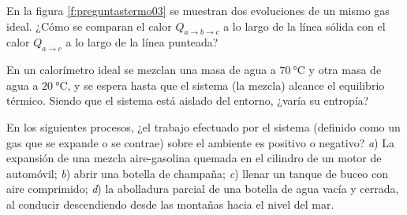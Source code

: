 %
\begin{Exercise}\label{p:preguntastermo03}
  En la figura \ref{f:preguntastermo03} se muestran dos evoluciones de un mismo gas ideal. ¿Cómo se comparan el calor $Q_{a\rightarrow b \rightarrow c}$ a lo largo de la línea sólida con el calor $Q_{a\rightarrow c}$ a lo largo de la línea punteada?
\end{Exercise}
%
\begin{center}
\end{center}
%
\begin{Exercise}
  {}{}
  En un calorímetro ideal se mezclan una masa de agua a $\SI{70}{\celsius}$ y otra masa de agua a $\SI{20}{\celsius}$, y se espera hasta que el sistema (la mezcla) alcance el equilibrio térmico. Siendo que el sistema está aislado del entorno, ¿varía su entropía?
\end{Exercise}
%
\begin{Exercise}
  En los siguientes procesos, ¿el trabajo efectuado por el sistema (definido como un gas que se expande o se contrae) sobre el ambiente es positivo o negativo? \textit{a}) La expansión de una mezcla aire-gasolina quemada en el cilindro de un motor de automóvil; \textit{b}) abrir una botella de champaña; \textit{c}) llenar un tanque de buceo con aire comprimido; \textit{d}) la abolladura parcial de una botella de agua vacía y cerrada, al conducir descendiendo desde las montañas hacia el nivel del mar.
\end{Exercise}

